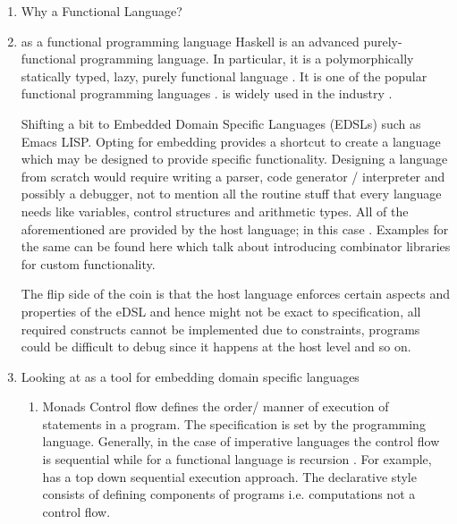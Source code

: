 \documentclass[thesis-solanki.tex]{subfiles}
\begin{document}
\begin{enumerate}

\item Why a Functional Language?

\item
   as a functional programming language Haskell is an advanced purely-functional programming
  language.
  In particular, it is a polymorphically statically typed, lazy, purely functional language
  \cite{website:haskellwiki}.
  It is one of the popular functional programming languages \cite{website:langpop}.
   is widely used in the industry \cite{website:haskellinindustry}.

  Shifting a bit to Embedded Domain Specific Languages (EDSLs) such as Emacs LISP.
  Opting for embedding provides a shortcut to create a language which may be designed to provide specific
  functionality.
  Designing a language from scratch would require writing a parser, code generator / interpreter and possibly a
  debugger, not to mention all the routine stuff that every language needs like variables, control structures and
  arithmetic types.
  All of the aforementioned are provided by the host language; in this case .
  Examples for the same can be found here \cite{jones2001composing, meyer2008eiffel} which talk about introducing
  combinator libraries for custom functionality.

  The flip side of the coin is that the host language enforces certain aspects and properties of the eDSL and hence
  might not be exact to specification, all required constructs cannot be implemented due to constraints, programs
  could be difficult to debug since it happens at the host level and so on.

\item Looking at  as a tool for embedding domain specific languages\cite{website:paulspontifications}

\begin{enumerate}
\item Monads
\newline
Control flow defines the order/ manner of execution of statements in a pro\-gram\cite{website:controlflowwiki}.
The specification is set by the programming language.
Generally, in the case of imperative languages the control flow is sequential while for a functional language is
recursion \cite{website:controlflowdalhousie}.
For example,  has a top down sequential execution approach.
The declarative style consists of defining components of programs i.e.
computations not a control flow\cite{website:declarativeprogrammingwiki}.


\end{enumerate}
\end{enumerate}
\end{document}
